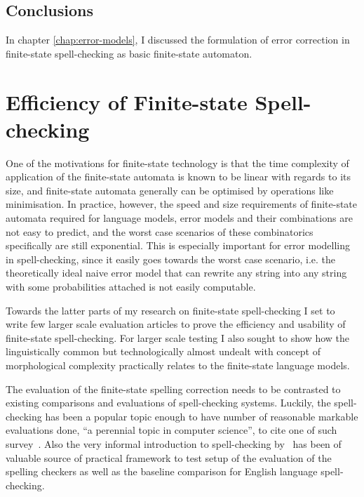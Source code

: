 \documentclass[officiallayout]{unihelcompling}
\begin{document}
\section{Conclusions}

In chapter \ref{chap:error-models}, I discussed the formulation of error
correction in finite-state spell-checking as basic finite-state automaton. 

\chapter{Efficiency of Finite-state Spell-checking}
\label{chap:efficiency}

One of the motivations for finite-state technology is that the time complexity
of application of the finite-state automata is known to be linear with regards
to its size, and finite-state automata generally can be optimised by operations
like minimisation. In practice, however, the speed and size requirements of
finite-state automata required for language models, error models and their
combinations are not easy to predict, and the worst case scenarios of these
combinatorics specifically are still exponential. This is especially important
for error modelling in spell-checking, since it easily goes towards the worst
case scenario, i.e. the theoretically ideal naive error model that can rewrite
any string into any string with some probabilities attached is not easily
computable.

Towards the latter parts of my research on finite-state spell-checking I set to
write few larger scale evaluation articles to prove the efficiency and
usability of finite-state spell-checking. For larger scale testing I also
sought to show how the linguistically common but technologically almost
undealt with concept of morphological complexity practically relates to the
finite-state language models.

The evaluation of the finite-state spelling correction needs to be contrasted
to existing comparisons and evaluations of spell-checking systems. Luckily, the
spell-checking has been a popular topic enough to have number of reasonable
markable evaluations done, ``a perennial topic in computer science'', to cite
one of such survey~\citep{kukich1992spelling}. Also the very informal
introduction to spell-checking by~\citep{norvig2010howto} has been of valuable
source of practical framework to test setup of the evaluation of the spelling
checkers as well as the baseline comparison for English language
spell-checking.
\end{document}
